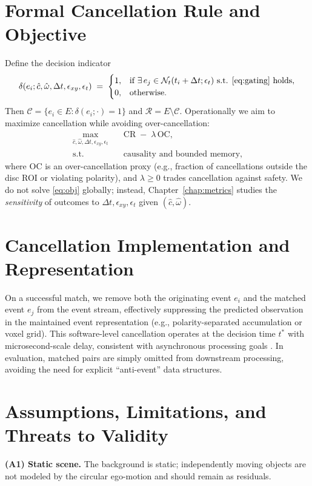 \section{Formal Cancellation Rule and Objective}
Define the decision indicator
\begin{equation}
\delta(e_i; \hat c,\hat\omega,\Delta t,\epsilon_{xy},\epsilon_t) \;=\;
\begin{cases}
1, & \text{if } \exists\, e_j \in \mathcal{N}_t(t_i+\Delta t;\epsilon_t) \text{ s.t. } \eqref{eq:gating}\text{ holds},\\
0, & \text{otherwise.}
\end{cases}
\label{eq:delta-indicator}
\end{equation}
Then $\mathcal{C}=\{e_i\in E:\delta(e_i;\cdot)=1\}$ and $\mathcal{R}=E\setminus \mathcal{C}$. Operationally we aim to maximize cancellation while avoiding over-cancellation:
\begin{align}
\max_{\hat c,\hat\omega,\Delta t,\epsilon_{xy},\epsilon_t} \quad & \mathrm{CR} \;-\; \lambda\, \mathrm{OC}, 
\label{eq:obj}\\
\text{s.t.} \quad & \text{causality and bounded memory},
\nonumber
\end{align}
where $\mathrm{OC}$ is an over-cancellation proxy (e.g., fraction of cancellations outside the disc ROI or violating polarity), and $\lambda\ge 0$ trades cancellation against safety. We do not solve \eqref{eq:obj} globally; instead, Chapter~\ref{chap:metrics} studies the \emph{sensitivity} of outcomes to $\Delta t,\epsilon_{xy},\epsilon_t$ given $(\hat c,\hat\omega)$.

\section{Cancellation Implementation and Representation}
On a successful match, we remove both the originating event $e_i$ and the matched event $e_j$ from the event stream, effectively suppressing the predicted observation in the maintained event representation (e.g., polarity-separated accumulation or voxel grid). This software-level cancellation operates at the decision time $t^*$ with microsecond-scale delay, consistent with asynchronous processing goals \cite{Gallego2018CMax,Bardow2016SOFIE}. In evaluation, matched pairs are simply omitted from downstream processing, avoiding the need for explicit ``anti-event'' data structures.

\section{Assumptions, Limitations, and Threats to Validity}
\label{sec:assumptions}
\textbf{(A1) Static scene.} The background is static; independently moving objects are not modeled by the circular ego-motion and should remain as residuals.

